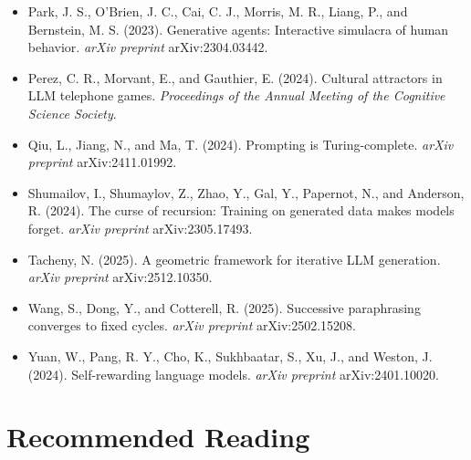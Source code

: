 \begin{itemize}
\item Park, J. S., O'Brien, J. C., Cai, C. J., Morris, M. R., Liang, P., and Bernstein, M. S. (2023). Generative agents: Interactive simulacra of human behavior. \textit{arXiv preprint} arXiv:2304.03442.
\end{itemize}

\begin{itemize}
\item Perez, C. R., Morvant, E., and Gauthier, E. (2024). Cultural attractors in LLM telephone games. \textit{Proceedings of the Annual Meeting of the Cognitive Science Society}.
\end{itemize}

\begin{itemize}
\item Qiu, L., Jiang, N., and Ma, T. (2024). Prompting is Turing-complete. \textit{arXiv preprint} arXiv:2411.01992.
\end{itemize}

\begin{itemize}
\item Shumailov, I., Shumaylov, Z., Zhao, Y., Gal, Y., Papernot, N., and Anderson, R. (2024). The curse of recursion: Training on generated data makes models forget. \textit{arXiv preprint} arXiv:2305.17493.
\end{itemize}

\begin{itemize}
\item Tacheny, N. (2025). A geometric framework for iterative LLM generation. \textit{arXiv preprint} arXiv:2512.10350.
\end{itemize}

\begin{itemize}
\item Wang, S., Dong, Y., and Cotterell, R. (2025). Successive paraphrasing converges to fixed cycles. \textit{arXiv preprint} arXiv:2502.15208.
\end{itemize}

\begin{itemize}
\item Yuan, W., Pang, R. Y., Cho, K., Sukhbaatar, S., Xu, J., and Weston, J. (2024). Self-rewarding language models. \textit{arXiv preprint} arXiv:2401.10020.
\end{itemize}



\section{Recommended Reading}

